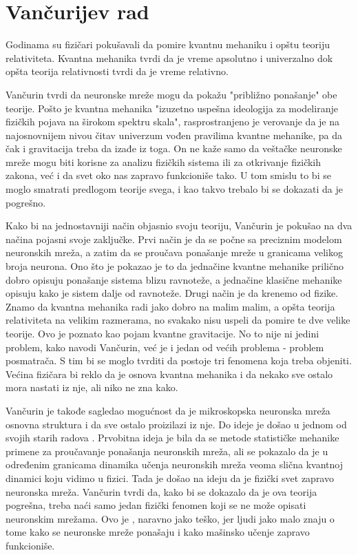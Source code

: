 \documentclass[a4paper]{article}
\begin{document}
\section{Vančurijev rad}

Godinama su fizičari pokušavali da pomire kvantnu mehaniku i opštu teoriju relativiteta. Kvantna mehanika tvrdi da je vreme apsolutno i univerzalno dok opšta teorija relativnosti tvrdi da je vreme relativno.

Vančurin tvrdi da neuronske mreže mogu da pokažu "približno ponašanje" obe teorije. Pošto je kvantna mehanika "izuzetno uspešna ideologija za modeliranje fizičkih pojava na širokom spektru skala", rasprostranjeno je verovanje da je na najosnovnijem nivou čitav univerzum vođen pravilima kvantne mehanike, pa da čak i gravitacija treba da izađe iz toga. On ne kaže samo da veštačke neuronske mreže mogu biti korisne za analizu fizičkih sistema ili za otkrivanje fizičkih zakona, već i da svet oko nas zapravo funkcioniše tako. U tom smislu to bi se moglo smatrati predlogom teorije svega, i kao takvo trebalo bi se dokazati da je pogrešno. 

Kako bi na jednostavniji način objasnio svoju teoriju, Vančurin je pokušao na dva načina pojasni svoje zaključke. Prvi način je da se počne sa preciznim modelom neuronskih mreža, a zatim da se proučava ponašanje mreže u granicama velikog broja neurona. Ono što je pokazao je to da jednačine kvantne mehanike prilično dobro opisuju ponašanje sistema blizu ravnoteže, a jednačine klasične mehanike opisuju kako je sistem dalje od ravnoteže. Drugi način je da krenemo od fizike. Znamo da kvantna mehanika radi jako dobro na malim malim, a opšta teorija relativiteta na velikim razmerama, no svakako nisu uspeli da pomire te dve velike teorije. Ovo je poznato kao pojam kvantne gravitacije. No to nije ni jedini problem, kako navodi Vančurin, već je i jedan od većih problema - problem posmatrača. S tim bi se moglo tvrditi da postoje tri fenomena koja treba objeniti. Većina fizičara bi reklo da je osnova kvantna mehanika i da nekako sve ostalo mora nastati iz nje, ali niko ne  zna kako. 

Vančurin je takođe sagledao mogućnost da je mikroskopska neuronska mreža osnovna struktura i da sve ostalo proizilazi iz nje. Do ideje je došao u jednom od svojih starih radova \cite{5}. Prvobitna ideja je bila da se metode statističke mehanike primene za proučavanje ponašanja neuronskih mreža, ali se pokazalo da je u određenim granicama dinamika učenja neuronskih mreža veoma slična kvantnoj dinamici koju vidimo u fizici. Tada je došao na ideju da je fizički svet zapravo neuronska mreža. Vančurin tvrdi da, kako bi se dokazalo da je ova teorija pogrešna, treba naći samo jedan fizički fenomen koji se ne može opisati neuronskim mrežama. Ovo je , naravno jako teško, jer ljudi jako malo znaju o tome kako se neuronske mreže ponašaju i kako mašinsko učenje zapravo funkcioniše. 
\end{document}
